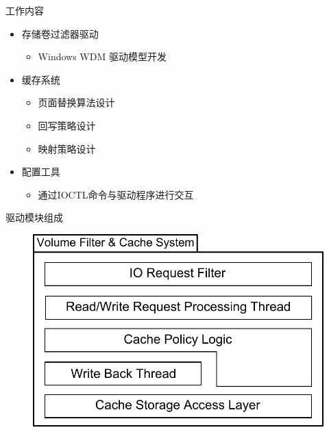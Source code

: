 \documentclass[compress]{beamer}
\begin{document}
\begin{frame}{工作内容}
\begin{itemize}
\item 存储卷过滤器驱动
    \begin{itemize}
    \item Windows WDM 驱动模型开发
    \end{itemize}
\item 缓存系统
    \begin{itemize}
    \item 页面替换算法设计
    \item 回写策略设计
    \item 映射策略设计
    \end{itemize}
\item 配置工具
    \begin{itemize}
    \item 通过IOCTL命令与驱动程序进行交互
    \end{itemize}
\end{itemize}
\end{frame}

\begin{frame}{驱动模块组成}
\begin{figure}
\includegraphics[width=0.8\linewidth]{../graph/sys-flt-arch}
\end{figure}
\end{frame}
\end{document}
